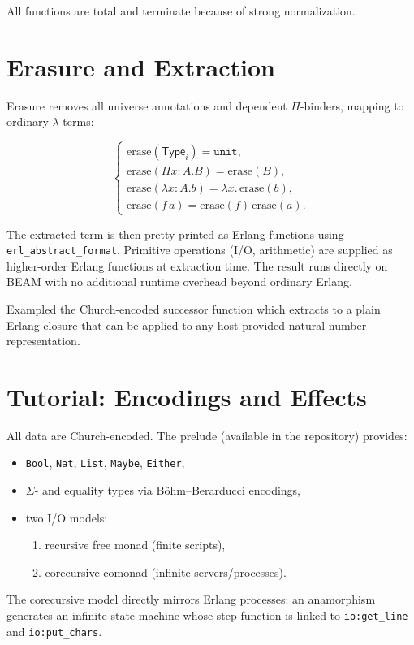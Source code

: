 \documentclass{article}
\begin{document}
All functions are total and terminate because of strong normalization.

\section{Erasure and Extraction}

Erasure removes all universe annotations and dependent $\Pi$-binders, mapping to ordinary $\lambda$-terms:

$$
\begin{cases}
\text{erase}(\mathsf{Type}_i) = \texttt{unit},\\
\text{erase}(\Pi x:A.B) = \text{erase}(B),\\
\text{erase}(\lambda x:A.b) = \lambda x.\,\text{erase}(b),\\
\text{erase}(f\,a) = \text{erase}(f)\,\text{erase}(a).
\end{cases}
$$

The extracted term is then pretty-printed as Erlang functions using \texttt{erl\_abstract\_format}.
Primitive operations (I/O, arithmetic) are supplied as higher-order Erlang functions at extraction time.
The result runs directly on BEAM with no additional runtime overhead beyond ordinary Erlang.

Exampled the Church-encoded successor function which extracts to a plain Erlang closure that
can be applied to any host-provided natural-number representation.

\section{Tutorial: Encodings and Effects}

All data are Church-encoded. The prelude (available in the repository) provides:
\begin{itemize}
\item \texttt{Bool}, \texttt{Nat}, \texttt{List}, \texttt{Maybe}, \texttt{Either},
\item $\Sigma$- and equality types via Böhm--Berarducci encodings,
\item two I/O models:
  \begin{enumerate}
  \item recursive free monad (finite scripts),
  \item corecursive comonad (infinite servers/processes).
  \end{enumerate}
\end{itemize}

The corecursive model directly mirrors Erlang processes: an anamorphism generates an infinite state machine whose step
function is linked to \texttt{io:get\_line} and \texttt{io:put\_chars}.
\end{document}
